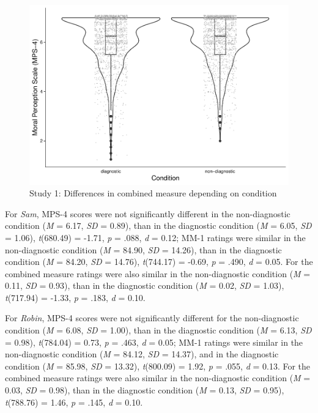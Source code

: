 \documentclass[
  american,
  man,floatsintext]{apa7}
\begin{document}
\begin{figure}[!p]
\includegraphics{Supplementary_files/figure-latex/S2combinedconditionplot-1} \caption{Study 1: Differences in combined measure depending on condition}\label{fig:S2combinedconditionplot}
\end{figure}

\newpage

For \emph{Sam}, MPS-4 scores were not significantly different in the non-diagnostic condition (\emph{M} = 6.17, \emph{SD} = 0.89), than in the diagnostic condition (\emph{M} = 6.05, \emph{SD} = 1.06), \emph{t}(680.49) = -1.71, \emph{p} = .088, \emph{d} = 0.12; MM-1 ratings were similar in the non-diagnostic condition (\emph{M} = 84.90, \emph{SD} = 14.26), than in the diagnostic condition (\emph{M} = 84.20, \emph{SD} = 14.76), \emph{t}(744.17) = -0.69, \emph{p} = .490, \emph{d} = 0.05. For the combined measure ratings were also similar in the non-diagnostic condition (\emph{M} = 0.11, \emph{SD} = 0.93), than in the diagnostic condition (\emph{M} = 0.02, \emph{SD} = 1.03), \emph{t}(717.94) = -1.33, \emph{p} = .183, \emph{d} = 0.10.

For \emph{Robin}, MPS-4 scores were not significantly different for the non-diagnostic condition (\emph{M} = 6.08, \emph{SD} = 1.00), than in the diagnostic condition (\emph{M} = 6.13, \emph{SD} = 0.98), \emph{t}(784.04) = 0.73, \emph{p} = .463, \emph{d} = 0.05; MM-1 ratings were similar in the non-diagnostic condition (\emph{M} = 84.12, \emph{SD} = 14.37), and in the diagnostic condition (\emph{M} = 85.98, \emph{SD} = 13.32), \emph{t}(800.09) = 1.92, \emph{p} = .055, \emph{d} = 0.13. For the combined measure ratings were also similar in the non-diagnostic condition (\emph{M} = 0.03, \emph{SD} = 0.98), than in the diagnostic condition (\emph{M} = 0.13, \emph{SD} = 0.95), \emph{t}(788.76) = 1.46, \emph{p} = .145, \emph{d} = 0.10.
\end{document}
